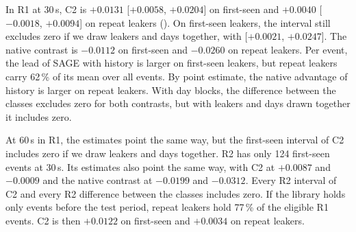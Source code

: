 In R1 at 30\,s, C2 is $+0.0131$ [$+0.0058$, $+0.0204$] on first-seen and $+0.0040$ [$-0.0018$, $+0.0094$] on repeat leakers ().
On first-seen leakers, the interval still excludes zero if we draw leakers and days together, with [$+0.0021$, $+0.0247$].
The native contrast is $-0.0112$ on first-seen and $-0.0260$ on repeat leakers.
Per event, the lead of SAGE with history is larger on first-seen leakers, but repeat leakers carry 62\,\% of its mean over all events.
By point estimate, the native advantage of history is larger on repeat leakers.
With day blocks, the difference between the classes excludes zero for both contrasts, but with leakers and days drawn together it includes zero.

At 60\,s in R1, the estimates point the same way, but the first-seen interval of C2 includes zero if we draw leakers and days together.
R2 has only 124 first-seen events at 30\,s.
Its estimates also point the same way, with C2 at $+0.0087$ and $-0.0009$ and the native contrast at $-0.0199$ and $-0.0312$.
Every R2 interval of C2 and every R2 difference between the classes includes zero.
If the library holds only events before the test period, repeat leakers hold 77\,\% of the eligible R1 events.
C2 is then $+0.0122$ on first-seen and $+0.0034$ on repeat leakers.


